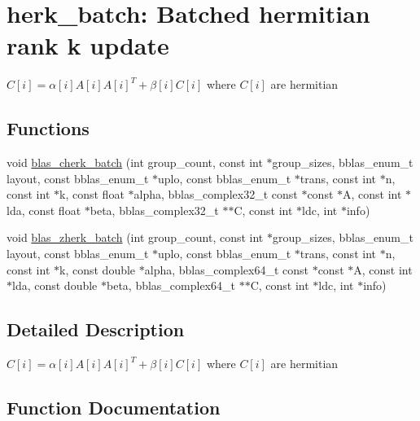 \hypertarget{group__herk__batch}{}\section{herk\+\_\+batch\+: Batched hermitian rank k update}
\label{group__herk__batch}


$ C[i] = \alpha[i] A[i] A[i]^T + \beta[i] C[i] $ where $ C[i] $ are hermitian  


\subsection*{Functions}
\begin{DoxyCompactItemize}
\item 
void \hyperlink{group__herk__batch_gabb4f6700925dbe222f5050d776de2629}{blas\+\_\+cherk\+\_\+batch} (int group\+\_\+count, const int $\ast$group\+\_\+sizes, bblas\+\_\+enum\+\_\+t layout, const bblas\+\_\+enum\+\_\+t $\ast$uplo, const bblas\+\_\+enum\+\_\+t $\ast$trans, const int $\ast$n, const int $\ast$k, const float $\ast$alpha, bblas\+\_\+complex32\+\_\+t const $\ast$const $\ast$A, const int $\ast$lda, const float $\ast$beta, bblas\+\_\+complex32\+\_\+t $\ast$$\ast$C, const int $\ast$ldc, int $\ast$info)
\item 
void \hyperlink{group__herk__batch_ga5623b4820ae30bfd3aef08b48491659b}{blas\+\_\+zherk\+\_\+batch} (int group\+\_\+count, const int $\ast$group\+\_\+sizes, bblas\+\_\+enum\+\_\+t layout, const bblas\+\_\+enum\+\_\+t $\ast$uplo, const bblas\+\_\+enum\+\_\+t $\ast$trans, const int $\ast$n, const int $\ast$k, const double $\ast$alpha, bblas\+\_\+complex64\+\_\+t const $\ast$const $\ast$A, const int $\ast$lda, const double $\ast$beta, bblas\+\_\+complex64\+\_\+t $\ast$$\ast$C, const int $\ast$ldc, int $\ast$info)
\end{DoxyCompactItemize}


\subsection{Detailed Description}
$ C[i] = \alpha[i] A[i] A[i]^T + \beta[i] C[i] $ where $ C[i] $ are hermitian 



\subsection{Function Documentation}
